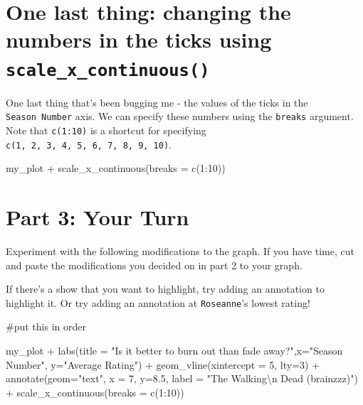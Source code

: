 \documentclass[
  letterpaper,
  DIV=11,
  numbers=noendperiod]{scrreprt}
\newenvironment{Shaded}{\begin{snugshade}}{\end{snugshade}}
\newcommand{\NormalTok}[1]{\textcolor[rgb]{0.00,0.23,0.31}{#1}}
\begin{document}
\section*{\texorpdfstring{One last thing: changing the numbers in the
ticks using
\texttt{scale\_x\_continuous()}}{One last thing: changing the numbers in the ticks using scale\_x\_continuous()}}\label{one-last-thing-changing-the-numbers-in-the-ticks-using-scale_x_continuous}


One last thing that's been bugging me - the values of the ticks in the
\texttt{Season\ Number} axis. We can specify these numbers using the
\texttt{breaks} argument. Note that \texttt{c(1:10)} is a shortcut for
specifying \texttt{c(1,\ 2,\ 3,\ 4,\ 5,\ 6,\ 7,\ 8,\ 9,\ 10)}.

\begin{Shaded}
\begin{Highlighting}[]
\NormalTok{my\_plot + }
\NormalTok{  scale\_x\_continuous(breaks = c(1:10))}
\end{Highlighting}
\end{Shaded}

\section*{Part 3: Your Turn}\label{part-3-your-turn}


Experiment with the following modifications to the graph. If you have
time, cut and paste the modifications you decided on in part 2 to your
graph.

If there's a show that you want to highlight, try adding an annotation
to highlight it. Or try adding an annotation at \texttt{Roseanne}'s
lowest rating!

\begin{Shaded}
\begin{Highlighting}[]
\NormalTok{\#put this in order}

\NormalTok{my\_plot + }
\NormalTok{    labs(title = "Is it better to burn out than fade away?",x="Season Number", y="Average Rating") + }
\NormalTok{  geom\_vline(xintercept = 5, lty=3) +}
\NormalTok{  annotate(geom="text", x = 7, y=8.5, label = "The Walking\textbackslash{}n Dead (brainzzz)") +}
\NormalTok{  scale\_x\_continuous(breaks = c(1:10))}
\end{Highlighting}
\end{Shaded}
\end{document}
